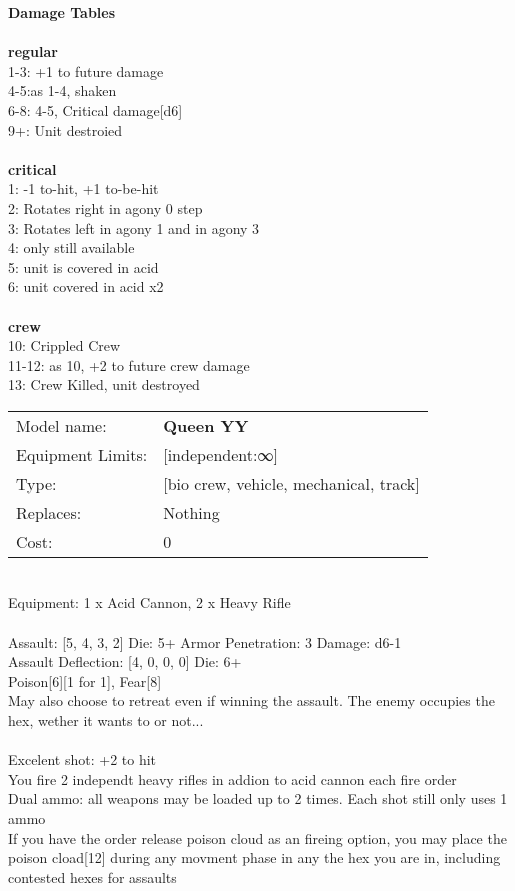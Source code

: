 {\bf Damage Tables} \\
\ \\ {\bf regular } \\
1-3: +1 to future damage \\
4-5:as 1-4, shaken \\
6-8: 4-5, Critical damage[d6] \\
9+: Unit destroied \\
\ \\ {\bf critical } \\
1: -1 to-hit, +1 to-be-hit \\
2: Rotates right in agony 0 step \\
3: Rotates left in agony 1 and in agony 3 \\
4: only still available \\
5: unit is covered in acid \\
6: unit covered in acid x2 \\
\ \\ {\bf crew } \\
10: Crippled Crew \\
11-12: as 10, +2 to future crew damage \\
13: Crew Killed, unit destroyed \\


\noindent
\begin{tabular}{ll}
Model name: &{\bf Queen YY } \\
Equipment Limits: &[independent:∞] \\
Type: &[bio crew, vehicle, mechanical, track] \\
Replaces: &Nothing \\
Cost: & 0\\
\end{tabular}
\ \\
Equipment: 1 x Acid Cannon, 2 x Heavy Rifle \\
\ \\
Assault: [5, 4, 3, 2] Die: 5+ Armor Penetration: 3 Damage: d6-1 \\
Assault Deflection: [4, 0, 0, 0] Die: 6+\\
\indent Poison[6][1 for 1], Fear[8]\\ 
May also choose to retreat even if winning the assault. The enemy occupies the hex, wether it wants to or not...\\ 
 
\ \\
Excelent shot: +2 to hit\\ 
You fire 2 independt heavy rifles in addion to acid cannon each fire order\\ 
Dual ammo: all weapons may be loaded up to 2 times. Each shot still only uses 1 ammo\\ 
If you have the order release poison cloud as an fireing option, you may place the poison cload[12] during any movment phase in any the hex you are in, including contested hexes for assaults\\ 

